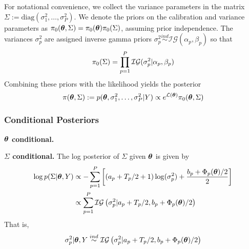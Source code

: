 \documentclass[12pt]{article}
\begin{document}
For notational convenience, we collect the variance parameters in the matrix $\Sigma := \text{diag}\left(\sigma_1^2, \dots, \sigma_P^2 \right)$. 
We denote the priors on the calibration and variance parameters as  $\pi_0(\boldsymbol{\theta}, \Sigma) = \pi_0(\boldsymbol{\theta})\pi_0(\Sigma)$, assuming prior independence.  
The variances $\sigma_p^2$ are assigned inverse gamma priors $\sigma_p^2 \overset{ind}{\sim} \mathcal{IG}(\alpha_p, \beta_p)$ so that 
\[\pi_0(\Sigma) = \prod_{p = 1}^{P} \mathcal{IG}(\sigma_p^2|\alpha_p, \beta_p)\]
Combining these priors with the likelihood yields the posterior 
\[\pi(\boldsymbol{\theta}, \Sigma) := p(\boldsymbol{\theta}, \sigma_1^2, \dots, \sigma_P^2|Y) \propto e^{\mathcal{L}(\boldsymbol{\theta})}\pi_0(\boldsymbol{\theta}, \Sigma)\]

\subsubsection{Conditional Posteriors}

\bigskip
\noindent
\textbf{$\boldsymbol{\theta}$ conditional.}

\bigskip
\noindent
\textbf{$\Sigma$ conditional.}
The log posterior of $\Sigma$ given $\boldsymbol{\theta}$ is given by 
\begin{align*}
\log p(\Sigma|\boldsymbol{\theta}, Y) &\propto -\sum_{p = 1}^{P} \left[\left(a_p + T_{p}/2 + 1 \right)\log(\sigma_p^2) + \frac{b_p + \Phi_p(\boldsymbol{\theta})/2}{2} \right] \\
				      &\propto \sum_{p = 1}^{P} \mathcal{IG}\left(\sigma_p^2|a_p + T_{p}/2, b_p + \Phi_p(\boldsymbol{\theta})/2 \right)
\end{align*}
That is, 
\begin{align*}
\sigma_p^2|\boldsymbol{\theta}, Y \overset{ind}{\sim} \mathcal{IG}\left(\sigma_p^2|a_p + T_{p}/2, b_p + \Phi_p(\boldsymbol{\theta})/2 \right)
\end{align*}

\end{document}
